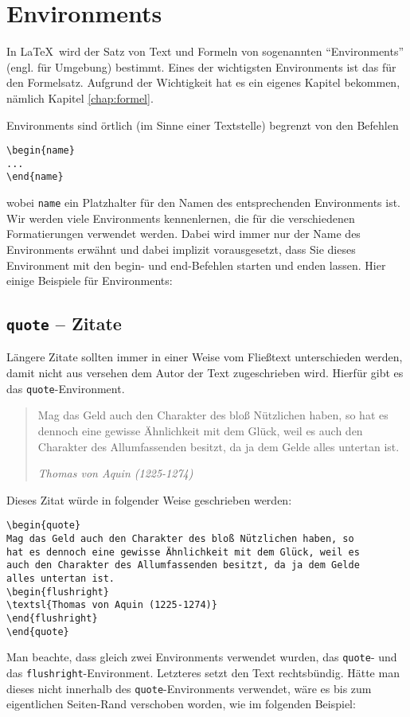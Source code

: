 \section{Environments}

In \LaTeX\ wird der Satz von Text und Formeln von sogenannten "`Environments"' (engl. für Umgebung) bestimmt. Eines der wichtigsten Environments ist das für den Formelsatz. Aufgrund der Wichtigkeit hat es ein eigenes Kapitel bekommen, nämlich Kapitel \ref{chap:formel}.

Environments sind örtlich (im Sinne einer Textstelle) begrenzt von den Befehlen 
\begin{verbatim}
\begin{name}
...
\end{name}
\end{verbatim}
wobei \texttt{name} ein Platzhalter für den Namen des entsprechenden Environments ist. Wir werden viele Environments kennenlernen, die für die verschiedenen Formatierungen verwendet werden. Dabei wird immer nur der Name des Environments erwähnt und dabei implizit vorausgesetzt, dass Sie dieses Environment mit den begin- und end-Befehlen starten und enden lassen. Hier einige Beispiele für Environments:

\subsection{\texttt{quote} -- Zitate} 

Längere Zitate sollten immer in einer Weise vom Fließtext unterschieden werden, damit nicht aus versehen dem Autor der Text zugeschrieben wird. Hierfür gibt es das \texttt{quote}-Environment.

\begin{quote}
Mag das Geld auch den Charakter des bloß Nützlichen haben, so hat es dennoch eine gewisse Ähnlichkeit mit dem Glück, weil es auch den Charakter des Allumfassenden besitzt, da ja dem Gelde alles untertan ist.
\begin{flushright}
\textsl{Thomas von Aquin (1225-1274)}
\end{flushright}
\end{quote}
Dieses Zitat würde in folgender Weise geschrieben werden:
\begin{verbatim}
\begin{quote}
Mag das Geld auch den Charakter des bloß Nützlichen haben, so 
hat es dennoch eine gewisse Ähnlichkeit mit dem Glück, weil es 
auch den Charakter des Allumfassenden besitzt, da ja dem Gelde 
alles untertan ist.
\begin{flushright}
\textsl{Thomas von Aquin (1225-1274)}
\end{flushright}
\end{quote}
\end{verbatim}
Man beachte, dass gleich zwei Environments verwendet wurden, das \texttt{quote}- und das \texttt{flushright}-Environment. Letzteres setzt den Text rechtsbündig. Hätte man dieses nicht innerhalb des \texttt{quote}-Environments verwendet, wäre es bis zum eigentlichen Seiten-Rand verschoben worden, wie im folgenden Beispiel:

